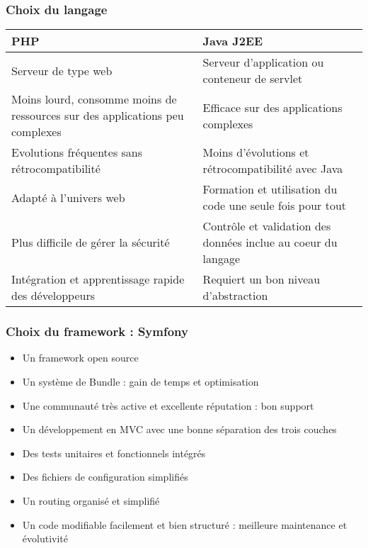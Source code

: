 \begin{frame}
  \frametitle{Choix du langage}
  \begin{center}
    \begin{tabular}[h]{|p{}|p{}|}
	\hline
	\cellcolor{blue!15}PHP & \cellcolor{blue!15}Java J2EE \\\hline
        Serveur de type web & Serveur d'application ou conteneur de servlet \\\hline
        Moins lourd, consomme moins de ressources sur des applications peu complexes & Efficace sur des applications complexes \\\hline
        Evolutions fréquentes sans rétrocompatibilité & Moins d'évolutions et rétrocompatibilité avec Java \\\hline
        Adapté à l'univers web & Formation et utilisation du code une seule fois pour tout \\\hline
        Plus difficile de gérer la sécurité & Contrôle et validation des données inclue au coeur du langage \\\hline
        Intégration et apprentissage rapide des développeurs & Requiert un bon niveau d'abstraction \\\hline
    \end{tabular}
  \end{center}
\end{frame}

\begin{frame}
  \frametitle{Choix du framework : Symfony}
  \begin{itemize}
    \item Un framework open source
    \item Un système de Bundle : gain de temps et optimisation
    \item Une communauté très active et excellente réputation : bon support  
    \item Un développement en MVC avec une bonne séparation des trois couches
    \item Des tests unitaires et fonctionnels intégrés
    \item Des fichiers de configuration simplifiés
    \item Un routing organisé et simplifié
    \item Un code modifiable facilement et bien structuré : meilleure maintenance et évolutivité
  \end{itemize}
\end{frame}
